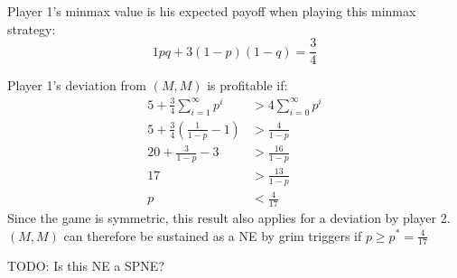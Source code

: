 \documentclass[../main.tex]{subfiles}
\begin{document}
\begin{solution}
\begin{enumerate}
Player 1's minmax value is his expected payoff when playing this minmax strategy:
\[
1 p q + 3 (1-p) (1-q) = \frac{3}{4}
\]
	
Player 1's deviation from $(M, M)$ is profitable if:
\begin{align*}
5 + \frac{3}{4} \sum\limits_{i=1}^{\infty} p^i &> 4 \sum\limits_{i=0}^{\infty} p^i \\
5 + \frac{3}{4} \left( \frac{1}{1 - p} - 1 \right) &> \frac{4}{1 - p} \\
20 + \frac{3}{1 - p} - 3 &> \frac{16}{1 - p} \\
17 &> \frac{13}{1 - p} \\
p &< \frac{4}{17}
\end{align*}
Since the game is symmetric, this result also applies for a deviation by player 2. \\
$(M, M)$ can therefore be sustained as a NE by grim triggers if $p \geq p^* = \frac{4}{17}$
	
TODO: Is this NE a SPNE?

\end{enumerate}
\end{solution}

\begin{question}
\end{question}

\begin{solution}
\end{solution}

\begin{question}
\end{question}

\begin{solution}
\end{solution}

\begin{question}
\end{question}

\begin{solution}
\end{solution}

\begin{question}
\end{question}

\begin{solution}
\end{solution}

\begin{question}
\end{question}

\begin{solution}
\end{solution}
\end{document}
